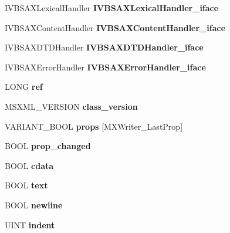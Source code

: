 \begin{DoxyCompactItemize}
I\+V\+B\+S\+A\+X\+Lexical\+Handler {\bfseries I\+V\+B\+S\+A\+X\+Lexical\+Handler\+\_\+iface}
\item 
\mbox{\label{structmxwriter_a857ba2275ea300756a33a47ac340a9d1}} 
I\+V\+B\+S\+A\+X\+Content\+Handler {\bfseries I\+V\+B\+S\+A\+X\+Content\+Handler\+\_\+iface}
\item 
\mbox{\label{structmxwriter_acad52660492642bf3bfe7eb8ea90b445}} 
I\+V\+B\+S\+A\+X\+D\+T\+D\+Handler {\bfseries I\+V\+B\+S\+A\+X\+D\+T\+D\+Handler\+\_\+iface}
\item 
\mbox{\label{structmxwriter_abeae332abc612e68c4997e6284a9bfac}} 
I\+V\+B\+S\+A\+X\+Error\+Handler {\bfseries I\+V\+B\+S\+A\+X\+Error\+Handler\+\_\+iface}
\item 
\mbox{\label{structmxwriter_ac840fdb5f7ec6d0f3aa00a243475c31b}} 
L\+O\+NG {\bfseries ref}
\item 
\mbox{\label{structmxwriter_a3863d4fadc04dc26282ba8ac5dee343f}} 
M\+S\+X\+M\+L\+\_\+\+V\+E\+R\+S\+I\+ON {\bfseries class\+\_\+version}
\item 
\mbox{\label{structmxwriter_aa16ea8167825afe9f66e75d1980e5fcf}} 
V\+A\+R\+I\+A\+N\+T\+\_\+\+B\+O\+OL {\bfseries props} \mbox{[}M\+X\+Writer\+\_\+\+Last\+Prop\mbox{]}
\item 
\mbox{\label{structmxwriter_af7e55c8e4c394c97c2eeee44c3dcc0eb}} 
B\+O\+OL {\bfseries prop\+\_\+changed}
\item 
\mbox{\label{structmxwriter_a22d3e3ea6d9dab436730daa9464df9d0}} 
B\+O\+OL {\bfseries cdata}
\item 
\mbox{\label{structmxwriter_a3a863b8f7a6f8ce4c6626c876f67e2b4}} 
B\+O\+OL {\bfseries text}
\item 
\mbox{\label{structmxwriter_a43ae7763da9c2bdd82389caafe5a2f45}} 
B\+O\+OL {\bfseries newline}
\item 
\mbox{\label{structmxwriter_a573e9f81152afc94284ae202efa4fdcd}} 
U\+I\+NT {\bfseries indent}

\end{DoxyCompactItemize}

